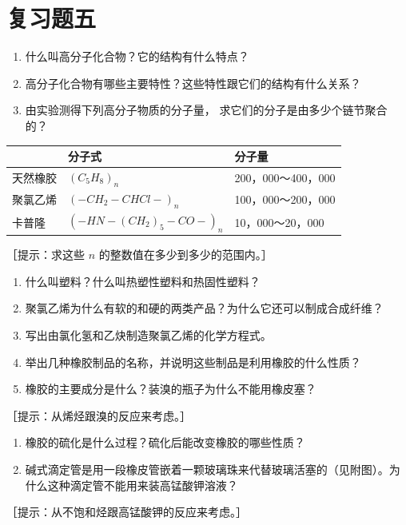 \section{复习题五}

\begin{enumerate}
\item
  什么叫高分子化合物？它的结构有什么特点？
\item
  高分子化合物有哪些主要特性？这些特性跟它们的结构有什么关系？
\item
  由实验测得下列高分子物质的分子量， 求它们的分子是由多少个链节聚合的？
\end{enumerate}

{\def\LTcaptype{none} %
\begin{longtable}[]{@{}lll@{}}
\toprule\noalign{}
& 分子式 & 分子量 \\
\midrule\noalign{}
\endhead
\bottomrule\noalign{}
\endlastfoot
天然橡胶 & \((C_5H_8)_n\) & 200，000～400，000 \\
聚氯乙烯 & \((-CH_2-CHCl-)_{n}\) & 100，000～200，000 \\
卡普隆 & \((-HN-(CH_2)_5-CO-)_{n}\) & 10，000～20，000 \\
\end{longtable}
}

［提示：求这些 \(n\) 的整数值在多少到多少的范围内。］

\begin{enumerate}[start=4]
\item
  什么叫塑料？什么叫热塑性塑料和热固性塑料？
\item
  聚氯乙烯为什么有软的和硬的两类产品？为什么它还可以制成合成纤维？
\item
  写出由氯化氢和乙炔制造聚氯乙烯的化学方程式。
\item
  举出几种橡胶制品的名称，并说明这些制品是利用橡胶的什么性质？
\item
  橡胶的主要成分是什么？装溴的瓶子为什么不能用橡皮塞？
\end{enumerate}

［提示：从烯烃跟溴的反应来考虑。］

\begin{enumerate}[start=9]
\item
  橡胶的硫化是什么过程？硫化后能改变橡胶的哪些性质？
\item
  碱式滴定管是用一段橡皮管嵌着一颗玻璃珠来代替玻璃活塞的（见附图）。为什么这种滴定管不能用来装高锰酸钾溶液？
\end{enumerate}

［提示：从不饱和烃跟高锰酸钾的反应来考虑。］

